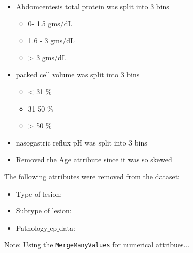 \begin{itemize}
\item Abdomcentesis total protein was split into 3 bins
\begin{itemize}
\item 0- 1.5 gms/dL
\item 1.6 - 3 gms/dL
\item > 3 gms/dL
\end{itemize}

\item packed cell volume was split into 3 bins
\begin{itemize}
\item < 31 \%
\item 31-50 \%
\item > 50 \%
\end{itemize}

\item nasogastric reflux pH was split into 3 bins

\item Removed the Age attribute since it was so skewed


\end{itemize}


The following attributes were removed from the dataset:
\begin{itemize}
\item Type of lesion:
\item Subtype of lesion:
\item Pathology$\_ $cp$ \_$data:
\end{itemize}
Note: Using the \verb|MergeManyValues| for numerical attribues...

